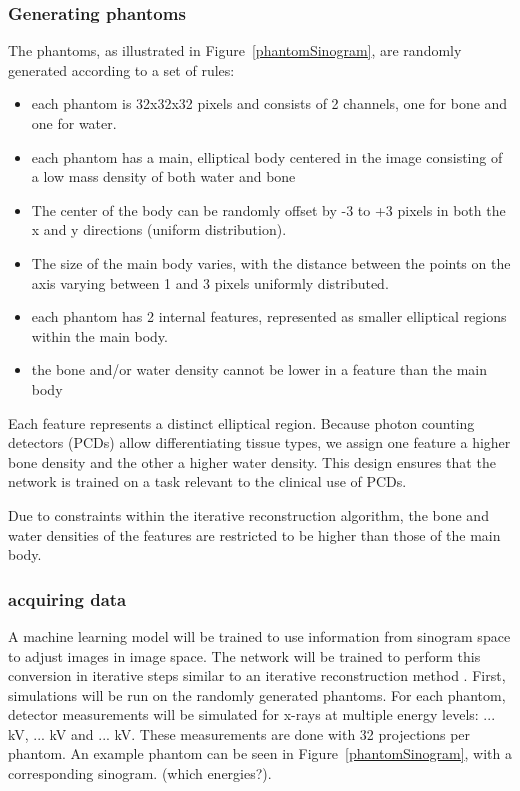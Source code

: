 \documentclass[9pt,Preprint]{lapreprint}
\begin{document}
\subsubsection{Generating phantoms}

The phantoms, as illustrated in Figure~\ref{phantomSinogram}, are randomly generated according to a set of rules:

\begin{itemize}
\item each phantom is 32x32x32 pixels and consists of 2 channels, one for bone and one for water.
\item each phantom has a main, elliptical body centered in the image consisting of a low mass density of both water and bone
\item The center of the body can be randomly offset by -3 to +3 pixels in both the x and y directions (uniform distribution).
\item The size of the main body varies, with the distance between the points on the axis varying between 1 and 3 pixels uniformly distributed.
\item each phantom has 2 internal features, represented as smaller elliptical regions within the main body.
\item the bone and/or water density cannot be lower in a feature than the main body
\end{itemize}

Each feature represents a distinct elliptical region. Because photon counting detectors (PCDs) allow differentiating tissue types, we assign one feature a higher bone density and the other a higher water density. This design ensures that the network is trained on a task relevant to the clinical use of PCDs.

Due to constraints within the iterative reconstruction algorithm, the bone and water densities of the features are restricted to be higher than those of the main body.

\subsubsection{acquiring data}

A machine learning model will be trained to use information from sinogram space to adjust images in image space. The network will be trained to perform this conversion in iterative steps similar to an iterative reconstruction method \parencite{mechlem2018joint}.
First, simulations will be run on the randomly generated phantoms. For each phantom, detector measurements will be simulated for x-rays at multiple energy levels: ... kV, ... kV and ... kV. These measurements are done with 32 projections per phantom. An example phantom can be seen in Figure~\ref{phantomSinogram}, with a corresponding sinogram. (which energies?).
\end{document}
